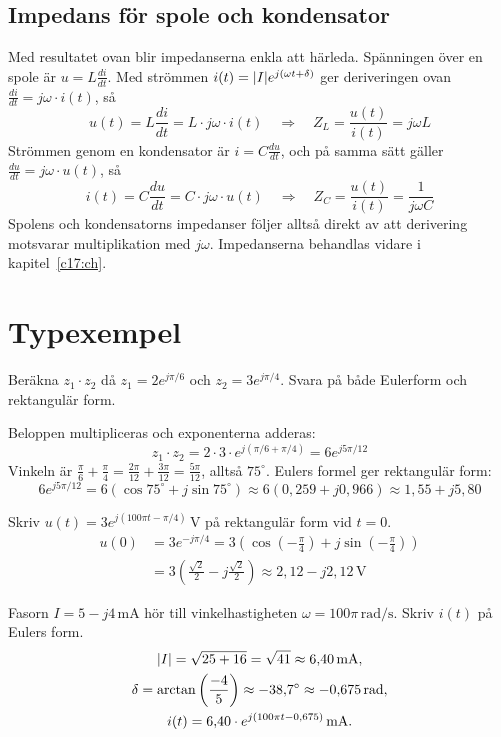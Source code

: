 \subsection{Impedans för spole och kondensator}
\label{c16:sec:impedans}
Med resultatet ovan blir impedanserna enkla att
härleda. Spänningen över en spole är $u = L\frac{di}{dt}$. Med strömmen
$i(t) = \lvert I\rvert e^{j(\omega t + \delta)}$ ger deriveringen ovan $\frac{di}{dt} = j\omega \cdot i(t)$,
så
\[
  u(t) = L\frac{di}{dt} = L \cdot j\omega \cdot i(t) \quad \Rightarrow \quad
  Z_L = \frac{u(t)}{i(t)} = j\omega L
\]
Strömmen genom en kondensator är $i = C\frac{du}{dt}$, och på samma sätt gäller
$\frac{du}{dt} = j\omega \cdot u(t)$, så
\[
  i(t) = C\frac{du}{dt} = C \cdot j\omega \cdot u(t) \quad \Rightarrow \quad
  Z_C = \frac{u(t)}{i(t)} = \frac{1}{j\omega C}
\]
Spolens och kondensatorns impedanser följer alltså direkt av att derivering motsvarar
multiplikation med $j\omega$. Impedanserna behandlas vidare i kapitel~\ref{c17:ch}.

\section{Typexempel}
\label{c16:sec:typexempel}

\begin{exempel}
Beräkna $z_1 \cdot z_2$ då $z_1 = 2e^{j\pi/6}$ och $z_2 = 3e^{j\pi/4}$. Svara på både Eulerform
och rektangulär form.

Beloppen multipliceras och exponenterna adderas:
\[
  z_1 \cdot z_2 = 2 \cdot 3 \cdot e^{j(\pi/6 + \pi/4)} = 6e^{j5\pi/12}
\]
Vinkeln är $\frac{\pi}{6} + \frac{\pi}{4} = \frac{2\pi}{12} + \frac{3\pi}{12} = \frac{5\pi}{12}$,
alltså $75^{\circ}$. Eulers formel ger rektangulär form:
\[
  6e^{j5\pi/12} = 6\left(\cos 75^{\circ} + j\sin 75^{\circ}\right)
    \approx 6(0{,}259 + j0{,}966) \approx 1{,}55 + j5{,}80
\]
\end{exempel}

\begin{exempel}
Skriv $u(t) = 3e^{j(100\pi t - \pi/4)}\,\text{V}$ på rektangulär form vid $t = 0$.
\begin{align*}
  u(0) &= 3e^{-j\pi/4}
        = 3\left(\cos\left(-\frac{\pi}{4}\right) + j\sin\left(-\frac{\pi}{4}\right)\right) \\
       &= 3\left(\frac{\sqrt{2}}{2} - j\frac{\sqrt{2}}{2}\right) \approx 2{,}12 - j2{,}12\,\text{V}
\end{align*}
\end{exempel}

\begin{exempel}
Fasorn $I = 5 - j4\,\text{mA}$ hör till vinkelhastigheten $\omega = 100\pi\,\text{rad/s}$.
Skriv $i(t)$ på Eulers form.
\begin{gather*}
  \lvert I\rvert = \sqrt{25 + 16} = \sqrt{41} \approx 6{,}40\,\text{mA}, \\
  \delta = \arctan\left(\frac{-4}{5}\right) \approx -38{,}7^{\circ} \approx -0{,}675\,\text{rad}, \\
  i(t) = 6{,}40 \cdot e^{j(100\pi t - 0{,}675)}\,\text{mA}.
\end{gather*}
\end{exempel}

